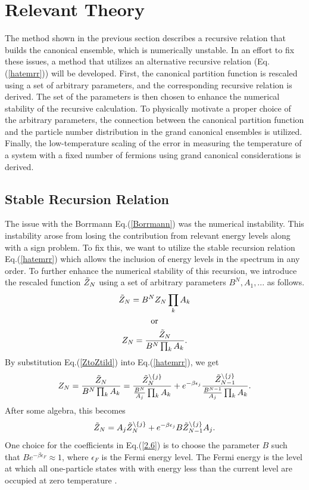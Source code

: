 \chapter{Relevant Theory} \label{ch:ns-equations}
\begin{em}
The method shown in the previous section describes a recursive relation that builds the canonical ensemble, which is numerically unstable. In an effort to fix these issues,  a method that utilizes an alternative recursive relation (Eq. (\ref{hatemrr})) will be developed. First, the canonical partition function is rescaled using a set of arbitrary parameters, and the corresponding recursive relation is derived. The set of the parameters is then chosen to enhance the numerical stability of the recursive calculation. To physically motivate a proper choice of the arbitrary parameters, the connection between the canonical partition function and the particle number distribution in the grand canonical ensembles is utilized. Finally, the low-temperature scaling of the error in measuring the temperature of a system with a fixed number of fermions using grand canonical considerations is derived.
\end{em}


\section{Stable Recursion Relation}
The issue with the Borrmann Eq.\@ (\ref{Borrmann}) was the numerical instability. This instability arose from losing the contribution from relevant energy levels along with a sign problem. To fix this, we want to utilize the stable recursion relation Eq.\@ (\ref{hatemrr}) which allows the inclusion of energy levels in the spectrum in any order. To further enhance the numerical stability of this recursion, we introduce the rescaled function $\Tilde{Z}_N$ using a set of arbitrary parameters ${B^N,A_1,...}$ as follows.
\begin{gather}
    \Tilde{Z}_N = B^N Z_N \prod_k A_k \label{ZtildtoZ}\\
    \text{or}\nonumber\\
    Z_N=\frac{\Tilde{Z}_N}{B^N \prod_k A_k}. \label{ZtoZtild}
\end{gather}
By substitution Eq.\@ (\ref{ZtoZtild}) into Eq.\@ (\ref{hatemrr}), we get
\begin{equation}
    Z_N=\frac{\Tilde{Z}_N}{B^N \prod_k A_k} = \frac{\Tilde{Z}_N^{\backslash\{j\}}}{\frac{B^N}{A_j} \prod_k A_k}+e^{-\beta\epsilon_j}\frac{\Tilde{Z}_{N-1}^{\backslash\{j\}}}{\frac{B^{N-1}}{A_j} \prod_k A_k}.
\end{equation}
After some algebra, this becomes
\begin{equation}
   \Tilde{Z}_N=A_j \Tilde{Z}_N^{\backslash\{j\}}+ e^{-\beta\epsilon_j} B \Tilde{Z}_{N-1}^{\backslash\{j\}} A_j.\label{2.6}
\end{equation}
One choice for the coefficients in Eq.\@ (\ref{2.6}) is to choose the parameter $B$ such that $B e^{-\beta\epsilon_F}\approx 1$, where $\epsilon_F$ is the Fermi energy level. The Fermi energy is the level at which all one-particle states with with energy less than the current level are occupied at zero temperature \cite{Kardar}.

